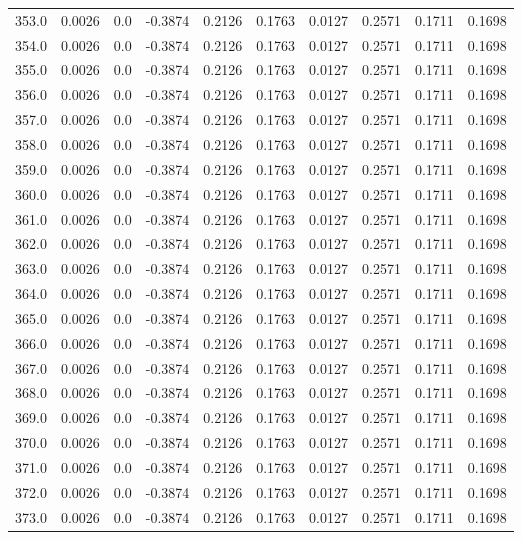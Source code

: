 \begin{longtable}{lrrrrrrrrr}
353.0 & 0.0026 & 0.0 & -0.3874 & 0.2126 & 0.1763 & 0.0127 & 0.2571 & 0.1711 & 0.1698 \\
354.0 & 0.0026 & 0.0 & -0.3874 & 0.2126 & 0.1763 & 0.0127 & 0.2571 & 0.1711 & 0.1698 \\
355.0 & 0.0026 & 0.0 & -0.3874 & 0.2126 & 0.1763 & 0.0127 & 0.2571 & 0.1711 & 0.1698 \\
356.0 & 0.0026 & 0.0 & -0.3874 & 0.2126 & 0.1763 & 0.0127 & 0.2571 & 0.1711 & 0.1698 \\
357.0 & 0.0026 & 0.0 & -0.3874 & 0.2126 & 0.1763 & 0.0127 & 0.2571 & 0.1711 & 0.1698 \\
358.0 & 0.0026 & 0.0 & -0.3874 & 0.2126 & 0.1763 & 0.0127 & 0.2571 & 0.1711 & 0.1698 \\
359.0 & 0.0026 & 0.0 & -0.3874 & 0.2126 & 0.1763 & 0.0127 & 0.2571 & 0.1711 & 0.1698 \\
360.0 & 0.0026 & 0.0 & -0.3874 & 0.2126 & 0.1763 & 0.0127 & 0.2571 & 0.1711 & 0.1698 \\
361.0 & 0.0026 & 0.0 & -0.3874 & 0.2126 & 0.1763 & 0.0127 & 0.2571 & 0.1711 & 0.1698 \\
362.0 & 0.0026 & 0.0 & -0.3874 & 0.2126 & 0.1763 & 0.0127 & 0.2571 & 0.1711 & 0.1698 \\
363.0 & 0.0026 & 0.0 & -0.3874 & 0.2126 & 0.1763 & 0.0127 & 0.2571 & 0.1711 & 0.1698 \\
364.0 & 0.0026 & 0.0 & -0.3874 & 0.2126 & 0.1763 & 0.0127 & 0.2571 & 0.1711 & 0.1698 \\
365.0 & 0.0026 & 0.0 & -0.3874 & 0.2126 & 0.1763 & 0.0127 & 0.2571 & 0.1711 & 0.1698 \\
366.0 & 0.0026 & 0.0 & -0.3874 & 0.2126 & 0.1763 & 0.0127 & 0.2571 & 0.1711 & 0.1698 \\
367.0 & 0.0026 & 0.0 & -0.3874 & 0.2126 & 0.1763 & 0.0127 & 0.2571 & 0.1711 & 0.1698 \\
368.0 & 0.0026 & 0.0 & -0.3874 & 0.2126 & 0.1763 & 0.0127 & 0.2571 & 0.1711 & 0.1698 \\
369.0 & 0.0026 & 0.0 & -0.3874 & 0.2126 & 0.1763 & 0.0127 & 0.2571 & 0.1711 & 0.1698 \\
370.0 & 0.0026 & 0.0 & -0.3874 & 0.2126 & 0.1763 & 0.0127 & 0.2571 & 0.1711 & 0.1698 \\
371.0 & 0.0026 & 0.0 & -0.3874 & 0.2126 & 0.1763 & 0.0127 & 0.2571 & 0.1711 & 0.1698 \\
372.0 & 0.0026 & 0.0 & -0.3874 & 0.2126 & 0.1763 & 0.0127 & 0.2571 & 0.1711 & 0.1698 \\
373.0 & 0.0026 & 0.0 & -0.3874 & 0.2126 & 0.1763 & 0.0127 & 0.2571 & 0.1711 & 0.1698 \\

\end{longtable}
